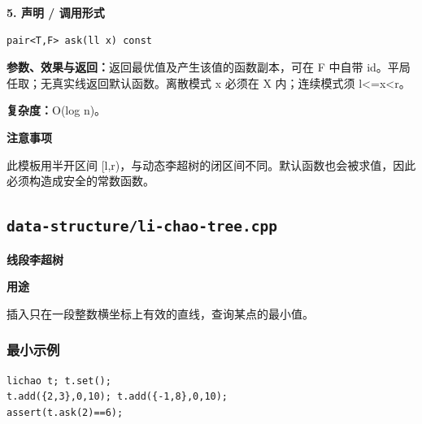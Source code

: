 \documentclass[UTF8,a4paper,10pt]{ctexart}
\newcommand{\TemplUsage}[1]{\textbf{用途}\par #1\par}
\newcommand{\TemplNote}[1]{\textbf{注意事项}\par #1\par}
\begin{document}
\noindent\begin{minipage}{\textwidth}
\textbf{5. 声明 / 调用形式}
\begin{lstlisting}
pair<T,F> ask(ll x) const
\end{lstlisting}
\textbf{参数、效果与返回：}返回最优值及产生该值的函数副本，可在 F 中自带 id。平局任取；无真实线返回默认函数。离散模式 x 必须在 X 内；连续模式须 l<=x<r。

\textbf{复杂度：}O(log n)。

\TemplNote{此模板用半开区间 [l,r)，与动态李超树的闭区间不同。默认函数也会被求值，因此必须构造成安全的常数函数。}
\end{minipage}\par\vspace{0.4em}
\clearpage
\subsection{\texttt{data-structure/li-chao-tree.cpp}}
\textbf{线段李超树}\par
\TemplUsage{插入只在一段整数横坐标上有效的直线，查询某点的最小值。}
\subsubsection*{最小示例}
\begin{lstlisting}
lichao t; t.set();
t.add({2,3},0,10); t.add({-1,8},0,10);
assert(t.ask(2)==6);
\end{lstlisting}
\end{document}
